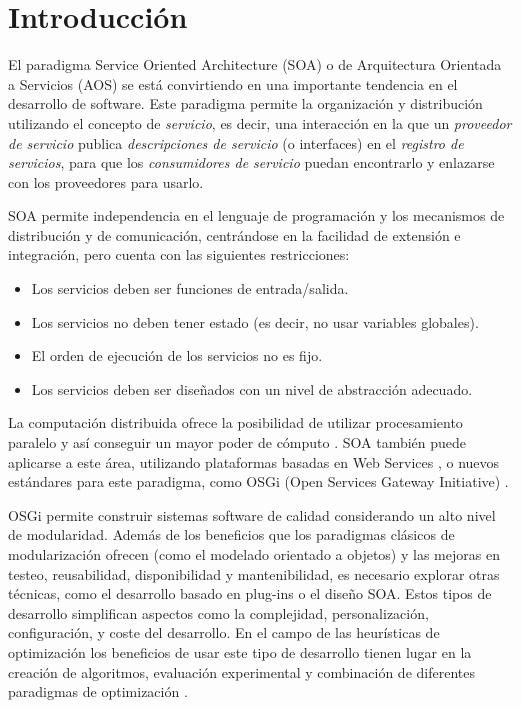 \documentclass[runningheads]{llncs}
\begin{document}
\section{Introducción}

\noindent El paradigma Service Oriented Architecture (SOA) o de
Arquitectura Orientada a Servicios (AOS) \cite{PAPAZOGLOU} se está
convirtiendo en una importante tendencia en el desarrollo de
software. Este paradigma permite la organización y distribución %
utilizando el concepto de {\em servicio}, es decir, una 
interacción en la que un {\em proveedor de servicio} publica {\em
  descripciones de servicio} (o interfaces) en el {\em registro de
  servicios}, para que los {\em consumidores de servicio} puedan
encontrarlo y enlazarse con los proveedores  para usarlo. 

SOA permite independencia en el lenguaje de programación y los mecanismos de distribución y de comunicación, centrándose en la facilidad de extensión e integración, pero cuenta con las siguientes restricciones:

\begin{itemize}
\item Los servicios deben ser funciones de entrada/salida.
\item Los servicios no deben tener estado (es decir, no usar variables globales).
\item El orden de ejecución de los servicios no es fijo.
\item Los servicios deben ser diseñados con un nivel de abstracción adecuado. %
\end{itemize}

La computación distribuida ofrece la posibilidad de utilizar procesamiento paralelo y así conseguir un mayor poder de cómputo \cite{OPENSCIENCEGRID}.
SOA también puede aplicarse a este área, utilizando plataformas basadas en Web Services \cite{PAPAZOGLOU}, o nuevos estándares para este paradigma, como OSGi (Open Services Gateway Initiative) \cite{OSGI}.

OSGi permite construir sistemas software de calidad considerando un alto nivel de modularidad. Además de los beneficios que los paradigmas clásicos de modularización ofrecen (como el modelado orientado a objetos) y las mejoras en testeo, reusabilidad, disponibilidad y mantenibilidad, es necesario explorar otras técnicas, como el desarrollo basado en plug-ins o el diseño SOA. Estos tipos de desarrollo simplifican aspectos como la complejidad, personalización, configuración, y coste del desarrollo. En el campo de las heurísticas de optimización los beneficios de usar este tipo de desarrollo tienen lugar en la creación de algoritmos, evaluación experimental y combinación de diferentes paradigmas de optimización \cite{PLUGINS}.
\end{document}
